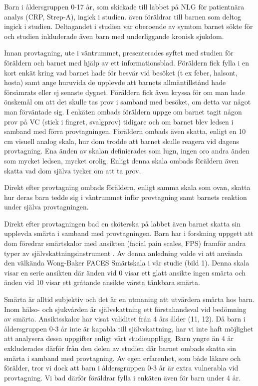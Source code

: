 \documentclass[12pt,twocolumn]{article}
\begin{document}
Barn i åldersgruppen 0-17 år, som skickade till labbet på NLG för
patientnära analys (CRP, Strep-A), ingick i studien. även föräldrar till
barnen som deltog ingick i studien. Deltagandet i studien var oberoende av
symtom barnet sökte för och studien inkluderade även barn med
underliggande kronisk sjukdom.

Innan provtagning, ute i väntrummet, presenterades syftet med studien för
föräldern och barnet med hjälp av ett informationsblad. Föräldern fick
fylla i en kort enkät kring vad barnet hade för besvär vid besöket (t ex
feber, halsont, hosta) samt ange huruvida de upplevde att barnets
allmäntillstånd hade försämrats eller ej senaste dygnet. Föräldern
fick även kryssa för om man hade önskemål om att det skulle tas prov i
samband med besöket, om detta var något man förväntade sig. I
enkäten ombads föräldern uppge om barnet tagit någon prov på VC
(stick i fingret, svalgprov) tidigare och om barnet blev ledsen i samband med
förra provtagningen. Föräldern ombads även skatta, enligt en 10 cm
visuell analog skala, hur dom trodde att barnet skulle reagera vid dagens
provtagning.
Ena änden av skalan definierades som lugn, ingen oro andra änden som
mycket ledsen, mycket orolig. Enligt denna skala ombads föräldern även
skatta vad dom själva tycker om att ta prov.

Direkt efter provtagning ombads föräldern, enligt samma skala som ovan,
skatta hur deras barn tedde sig i väntrummet inför provtagning samt barnets
reaktion under själva provtagningen.

Direkt efter provtagningen bad en sköterska på labbet även barnet skatta
sin upplevda smärta i samband med provtagningen. Barn har i forskning uppgett
att dom föredrar smärtskalor med ansikten (facial pain scales, FPS)
framför andra typer av självskattningsinstrument \cite{vBayer2006}. Av denna
anledning valde vi att använda den välkända Wong-Baker FACES Smärtskala
i vår studie (bild 1). Denna skala visar en serie ansikten där änden vid
0 visar ett glatt ansikte ingen smärta och änden vid 10 visar ett
gråtande ansikte värsta tänkbara smärta.


Smärta är alltid subjektiv och det är en utmaning att utvärdera smärta
hos barn.
Inom hälso- och sjukvården är självskattning ett förstahandsval vid
bedömning av smärta. Ansiktsskalor har visat validitet från 4 års
ålder (11, 12). Då barn i åldersgruppen 0-3 år inte är kapabla
till självskattning, har vi inte haft möjlighet att analysera dessa
uppgifter enligt vårt studieupplägg. Barn yngre än 4 år exkluderades
därför från den delen av studien där barnet ombads skatta sin smärta
i samband med provtagning. Av egen erfarenhet, som både läkare och
förälder, tror vi dock att barn i åldersgruppen 0-3 år är extra
vulnerabla vid provtagning. Vi bad därför föräldrar fylla i enkäten
även för barn under 4 år.
\end{document}

